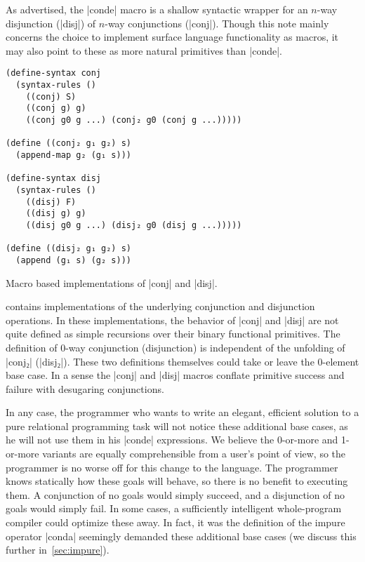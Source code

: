\documentclass[sigplan,screen,draft,anonymous,review,natbib=false]{acmart}
\begin{document}
As advertised, the \rackinline|conde| macro is a shallow syntactic
wrapper for an $n$-way disjunction (\rackinline|disj|) of $n$-way
conjunctions (\rackinline|conj|). Though this note mainly concerns the
choice to implement surface language functionality as macros, it may
also point to these as more natural primitives than
\rackinline|conde|.

\begin{listing}
  \begin{verbatim}
(define-syntax conj
  (syntax-rules ()
    ((conj) S)
    ((conj g) g)
    ((conj g0 g ...) (conj₂ g0 (conj g ...)))))

(define ((conj₂ g₁ g₂) s)
  (append-map g₂ (g₁ s)))

(define-syntax disj
  (syntax-rules ()
    ((disj) F)
    ((disj g) g)
    ((disj g0 g ...) (disj₂ g0 (disj g ...)))))

(define ((disj₂ g₁ g₂) s)
  (append (g₁ s) (g₂ s)))
  \end{verbatim}
  \caption{Macro based implementations of \rackinline|conj| and \rackinline|disj|.}
  \label{mnt:conj-and-disj-implementation}
\end{listing}

 contains implementations of
the underlying conjunction and disjunction operations. In these
implementations, the behavior of \rackinline|conj| and
\rackinline|disj| are not quite defined as simple recursions over
their binary functional primitives. The definition of 0-way
conjunction (disjunction) is independent of the unfolding of
\rackinline|conj₂| (\rackinline|disj₂|). These two definitions
themselves could take or leave the 0-element base case. In a sense the
\rackinline|conj| and \rackinline|disj| macros conflate primitive
success and failure with desugaring conjunctions.

In any case, the programmer who wants to write an elegant, efficient
solution to a pure relational programming task will not notice these
additional base cases, as he will not use them in his
\rackinline|conde| expressions. We believe the 0-or-more and 1-or-more
variants are equally comprehensible from a user's point of view, so
the programmer is no worse off for this change to the language. The
programmer knows statically how these goals will behave, so there is
no benefit to executing them. A conjunction of no goals would simply
succeed, and a disjunction of no goals would simply fail. In some
cases, a sufficiently intelligent whole-program compiler could
optimize these away. In fact, it was the definition of the impure
operator \rackinline|conda| seemingly demanded these additional base
cases (we discuss this further in~\cref{sec:impure}).
\end{document}
